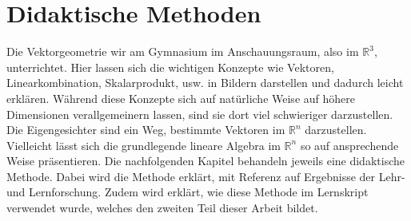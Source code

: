 \section*{Didaktische Methoden}
Die Vektorgeometrie wir am Gymnasium im Anschauungsraum, also im $\mathbb R^3$, unterrichtet.
Hier lassen sich die wichtigen Konzepte wie Vektoren, Linearkombination, Skalarprodukt, usw. in Bildern darstellen und dadurch leicht erklären.
Während diese Konzepte sich auf natürliche Weise auf höhere Dimensionen verallgemeinern lassen, sind sie dort viel schwieriger darzustellen.
Die Eigengesichter sind ein Weg, bestimmte Vektoren im $\mathbb R^n$ darzustellen.
Vielleicht lässt sich die grundlegende lineare Algebra im $\mathbb R^n$ so auf ansprechende Weise präsentieren.
Die nachfolgenden Kapitel behandeln jeweils eine didaktische Methode.
Dabei wird die Methode erklärt, mit Referenz auf Ergebnisse der Lehr- und Lernforschung.
Zudem wird erklärt, wie diese Methode im Lernskript verwendet wurde, welches den zweiten Teil dieser Arbeit bildet.
